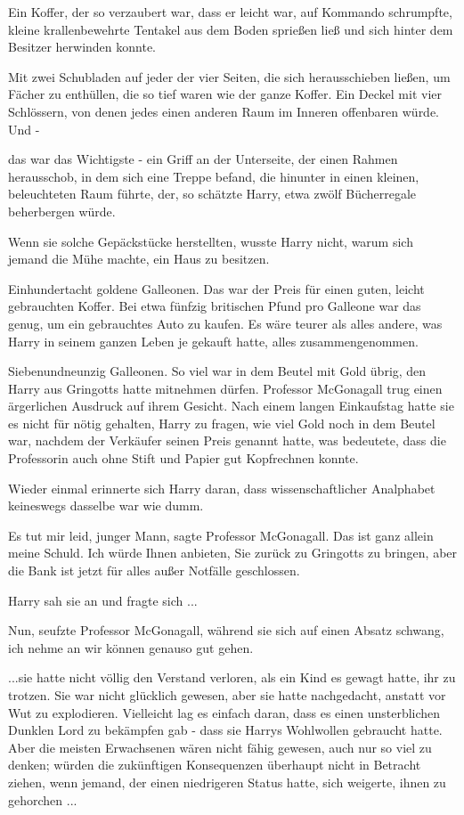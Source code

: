 Ein Koffer, der so verzaubert war, dass er leicht war, auf Kommando schrumpfte,
kleine krallenbewehrte Tentakel aus dem Boden sprießen ließ und sich hinter dem
Besitzer herwinden konnte.

Mit zwei Schubladen auf jeder der vier Seiten, die sich herausschieben ließen,
um Fächer zu enthüllen, die so tief waren wie der ganze Koffer. Ein Deckel mit
vier Schlössern, von denen jedes einen anderen Raum im Inneren offenbaren würde.
Und -

das war das Wichtigste - ein Griff an der Unterseite, der einen Rahmen
herausschob, in dem sich eine Treppe befand, die hinunter in einen kleinen,
beleuchteten Raum führte, der, so schätzte Harry, etwa zwölf Bücherregale
beherbergen würde.

Wenn sie solche Gepäckstücke herstellten, wusste Harry nicht, warum sich jemand
die Mühe machte, ein Haus zu besitzen.

Einhundertacht goldene Galleonen. Das war der Preis für einen guten, leicht
gebrauchten Koffer. Bei etwa fünfzig britischen Pfund pro Galleone war das
genug, um ein gebrauchtes Auto zu kaufen. Es wäre teurer als alles andere, was
Harry in seinem ganzen Leben je gekauft hatte, alles zusammengenommen.

Siebenundneunzig Galleonen. So viel war in dem Beutel mit Gold übrig, den Harry
aus Gringotts hatte mitnehmen dürfen. Professor McGonagall trug einen
ärgerlichen Ausdruck auf ihrem Gesicht. Nach einem langen Einkaufstag hatte sie
es nicht für nötig gehalten, Harry zu fragen, wie viel Gold noch in dem Beutel
war, nachdem der Verkäufer seinen Preis genannt hatte, was bedeutete, dass die
Professorin auch ohne Stift und Papier gut Kopfrechnen konnte.

Wieder einmal erinnerte sich Harry daran, dass wissenschaftlicher Analphabet
keineswegs dasselbe war wie dumm.

\glqq{}Es tut mir leid, junger Mann\grqq{}, sagte Professor McGonagall.
\glqq{}Das ist ganz allein meine Schuld. Ich würde Ihnen anbieten, Sie zurück zu
Gringotts zu bringen, aber die Bank ist jetzt für alles außer Notfälle
geschlossen.\grqq{}

Harry sah sie an und fragte sich ...

\glqq{}Nun\grqq{}, seufzte Professor McGonagall, während sie sich auf einen
Absatz schwang, \glqq{}ich nehme an wir können genauso gut gehen.\grqq{}

...sie hatte nicht völlig den Verstand verloren, als ein Kind es gewagt hatte,
ihr zu trotzen. Sie war nicht glücklich gewesen, aber sie hatte nachgedacht,
anstatt vor Wut zu explodieren. Vielleicht lag es einfach daran, dass es einen
unsterblichen Dunklen Lord zu bekämpfen gab - dass sie Harrys Wohlwollen
gebraucht hatte. Aber die meisten Erwachsenen wären nicht fähig gewesen, auch
nur so viel zu denken; würden die zukünftigen Konsequenzen überhaupt nicht in
Betracht ziehen, wenn jemand, der einen niedrigeren Status hatte, sich weigerte,
ihnen zu gehorchen ...

